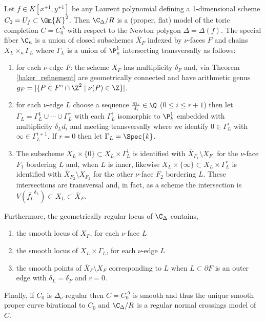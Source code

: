 \begin{theorem}
Let $f \in K[x^{\pm 1}, y^{\pm 1}]$ be any Laurent polynomial defining a 1-dimensional scheme $C_0 = U_f \subset \Gm{K}^2$. Then $\C_\Delta / R$ is a (proper, flat) model of the toric completion $C = C_0^\Delta$ with respect to the Newton polygon $\Delta = \Delta(f)$. The special fiber $\C_\kappa$ is a union of closed subschemes $\overline{X}_F$ indexed by $\nu$-faces $F$ and chains $X_L \times_\kappa \Gamma_L$ where $\Gamma_L$ is a union of $\P^1_{\kappa}$ intersecting transversally as follows:
\begin{enumerate}
\item for each $\nu$-edge $F$: the scheme $\overline{X}_F$ has multiplicity $\delta_F$ and, via Theorem \ref{baker_refinement} are geometrically connected and have arithmetic genus $ g_F = |\{ P \in F^\circ \cap \Z^2 \mid \nu(P) \in \Z \} | $.
\item for each $\nu$-edge $L$ choose a sequence $\frac{m_i}{d_i} \in \Q$ ($0 \le i \le r+1$) then let $\Gamma_L = \Gamma^1_L \cup \cdots \cup \Gamma^r_L$ with each $\Gamma^i_L$ isomorphic to $\P^1_k$ embedded with multiplicity $\delta_L d_i$ and meeting transversally where we identify $0 \in \Gamma^i_L$ with $\infty \in \Gamma^{i+1}_L$. If $r = 0$ then let $\Gamma_L = \Spec{k}$.
\item The subscheme $X_L \times \{ 0 \} \subset X_L \times \Gamma^1_L$ is identified with $\overline{X}_{F_1} \setminus X_{F_1}$ for the $\nu$-face $F_1$ bordering $L$ and, when $L$ is inner, likewise $X_L \times \{ \infty \} \subset X_L \times \Gamma^r_L$ is identified with $\overline{X}_{F_2} \setminus X_{F_2}$ for the other $\nu$-face $F_2$ bordering $L$. These intersections are transversal and, in fact, as a scheme the intersection is $V(\overline{f_L}^{\delta_L}) \subset X_L \subset \overline{X}_F$. 
\end{enumerate}
Furthermore, the geometrically regular locus of $\C_\Delta$ contains,
\begin{enumerate}
\item the smooth locus of $X_F$, for each $\nu$-face $L$
\item the smooth locus of $X_L \times \Gamma_L$, for each $\nu$-edge $L$
\item the smooth points of $\overline{X}_F \setminus X_F$ corresponding to $L$ when $L \subset \partial F$ is an outer edge with $\delta_L = \delta_F$ and $r = 0$. 
\end{enumerate}
Finally, if $C_0$ is $\Delta_\nu$-regular then $C = C_0^\Delta$ is smooth and thus the unique smooth proper curve birational to $C_0$ and $\C_\Delta / R$ is a regular normal crossings model of $C$. 
\end{theorem}

